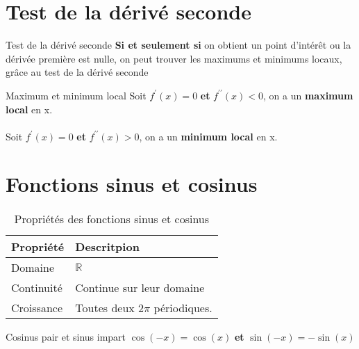 \documentclass{report}
\begin{document}
\begin{multicols*}{3}
\section{Test de la dérivé seconde}
\begin{Concept}{Test de la dérivé seconde}{}
\textbf{Si et seulement si} on obtient un point d'intérêt ou la dérivée première est nulle, on peut trouver 
les maximums et minimums locaux, grâce au test de la dérivé seconde    
\end{Concept}

\begin{Definitionx*}{Maximum et minimum local}{}
  Soit $f^{\prime}\left(x\right) = 0$ \textcolor{myb}{\textbf{et}} $f^{\prime\prime}\left(x\right) < 0$, on a  
  un \textbf{maximum local} en x. \\\\
    Soit $f^{\prime}\left(x\right) = 0$ \textcolor{myb}{\textbf{et}} $f^{\prime\prime}\left(x\right) > 0$, on a  
  un \textbf{minimum local} en x.
\end{Definitionx*}

\section{Fonctions sinus et cosinus}
\begin{table}[H]
  \caption {Propriétés des fonctions sinus et cosinus}

  \begin{center}
    \renewcommand{\arraystretch}{1.5}
    \selectfont
    \footnotesize
    \begin{tabular}{l|l}
    \arrayrulecolor{blue}\hline
    \rowcolor{lightBlue}
    \textcolor{myb}{Propriété} & \textcolor{myb}{Descritpion}
    \\
    \hline
    \arrayrulecolor{black}
Domaine
& 
$\mathbb{R}$
\\
\hline
Continuité
&
Continue sur leur domaine  
\\
\hline
Croissance 
&
Toutes deux $2\pi$ périodiques. 
\\
\hline
\end{tabular}
\end{center}
\end{table}

\begin{Identite}{Cosinus pair et sinus impart}{}
  $\cos\left(-x\right) = \cos\left(x\right)$ \textcolor{myb}{\textbf{et}} 
  $\sin\left(-x\right) = -\sin\left(x\right)$
\end{Identite}


\end{multicols*}
\end{document}
